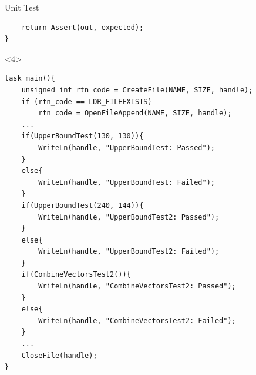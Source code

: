 \begin{frame}[fragile]{Unit Test}
\begin{onlyenv}
\begin{center}
\begin{minipage}[H]{0.9\linewidth}
\begin{lstlisting}
  	return Assert(out, expected);
}
\end{lstlisting} 
\end{minipage}
\end{center}
\end{onlyenv}
\begin{onlyenv}<4>
\begin{center}
\begin{minipage}[H]{0.9\linewidth}
\begin{lstlisting}
task main(){
	unsigned int rtn_code = CreateFile(NAME, SIZE, handle);
   	if (rtn_code == LDR_FILEEXISTS)
     	rtn_code = OpenFileAppend(NAME, SIZE, handle);
  	...
 	if(UpperBoundTest(130, 130)){
    	WriteLn(handle, "UpperBoundTest: Passed");
  	}
 	else{
    	WriteLn(handle, "UpperBoundTest: Failed");
  	}
  	if(UpperBoundTest(240, 144)){
    	WriteLn(handle, "UpperBoundTest2: Passed");
  	}
  	else{
    	WriteLn(handle, "UpperBoundTest2: Failed");
  	}
  	if(CombineVectorsTest2()){
    	WriteLn(handle, "CombineVectorsTest2: Passed");
  	}
  	else{
    	WriteLn(handle, "CombineVectorsTest2: Failed");
  	}
  	...
  	CloseFile(handle);
}
\end{lstlisting} 
\end{minipage}
\end{center}
\end{onlyenv}


\end{frame}
